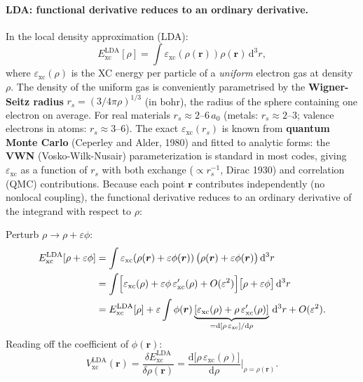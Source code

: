 \documentclass[12pt,letterpaper]{article}
\newcommand{\dd}{\mathrm{d}}
\newcommand{\Vxc}{V_{\mathrm{xc}}}
\newcommand{\Exc}{E_{\mathrm{xc}}}
\theoremstyle{definition}
\begin{document}
\paragraph{LDA: functional derivative reduces to an ordinary derivative.}
In the local density approximation (LDA):
\begin{equation}
  \Exc^{\mathrm{LDA}}[\rho] = \int \varepsilon_{\mathrm{xc}}\!\left(\rho(\bm{r})\right)
    \rho(\bm{r})\,\dd^3r,
  \label{eq:exc_lda}
\end{equation}
where $\varepsilon_{\mathrm{xc}}(\rho)$ is the XC energy per particle of a
\emph{uniform} electron gas at density $\rho$.
The density of the uniform gas is conveniently parametrised by the
\textbf{Wigner-Seitz radius} $r_s = (3/4\pi\rho)^{1/3}$ (in bohr),
the radius of the sphere containing one electron on average.
For real materials $r_s \approx 2$--$6\,a_0$ (metals: $r_s\approx2$--$3$;
valence electrons in atoms: $r_s\approx 3$--$6$).
The exact $\varepsilon_{\mathrm{xc}}(r_s)$ is known from
\textbf{quantum Monte Carlo} (Ceperley and Alder, 1980) and fitted to
analytic forms: the \textbf{VWN} (Vosko-Wilk-Nusair) parameterization
is standard in most codes, giving $\varepsilon_{\mathrm{xc}}$ as a
function of $r_s$ with both exchange ($\propto r_s^{-1}$, Dirac 1930)
and correlation (QMC) contributions.
Because each point $\bm{r}$ contributes independently (no nonlocal coupling),
the functional derivative reduces to an ordinary derivative of the integrand
with respect to $\rho$:

\begin{derivbox}
Perturb $\rho\to\rho+\varepsilon\phi$:
\begin{align}
  \Exc^{\mathrm{LDA}}[\rho+\varepsilon\phi]
  &= \int \varepsilon_{\mathrm{xc}}\!\left(\rho(\bm{r})+\varepsilon\phi(\bm{r})\right)
    \bigl(\rho(\bm{r})+\varepsilon\phi(\bm{r})\bigr)\,\dd^3r \notag\\
  &= \int
    \Bigl[\varepsilon_{\mathrm{xc}}(\rho)
    + \varepsilon\phi\,\varepsilon_{\mathrm{xc}}'(\rho)
    + O(\varepsilon^2)\Bigr]
    \bigl[\rho + \varepsilon\phi\bigr]\,\dd^3r \notag\\
  &= \Exc^{\mathrm{LDA}}[\rho]
    + \varepsilon\int\phi(\bm{r})
      \underbrace{\left[\varepsilon_{\mathrm{xc}}(\rho)
        + \rho\,\varepsilon_{\mathrm{xc}}'(\rho)\right]}_{
        = \dd[\rho\,\varepsilon_{\mathrm{xc}}]/\dd\rho}
      \,\dd^3r + O(\varepsilon^2).
\end{align}
Reading off the coefficient of $\phi(\bm{r})$:
\begin{equation}
  \boxed{\Vxc^{\mathrm{LDA}}(\bm{r})
    = \frac{\delta\Exc^{\mathrm{LDA}}}{\delta\rho(\bm{r})}
    = \frac{\dd\bigl[\rho\,\varepsilon_{\mathrm{xc}}(\rho)\bigr]}{\dd\rho}
    \bigg|_{\rho = \rho(\bm{r})}.}
  \label{eq:vxc_lda}
\end{equation}
\end{derivbox}
\end{document}
